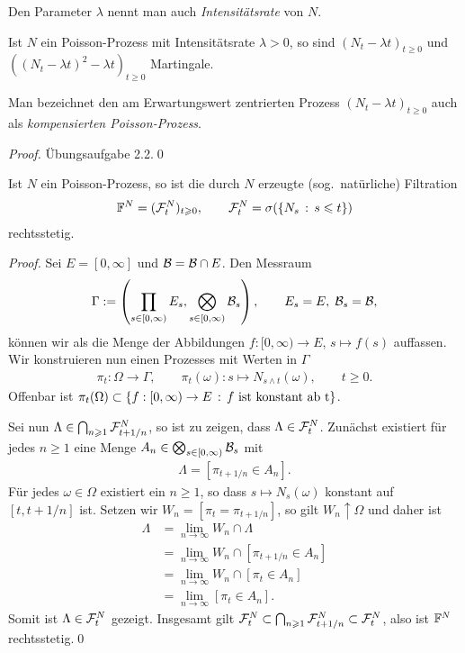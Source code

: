 Den Parameter $\lambda$ nennt man auch \emph{Intensitätsrate} von $N$.

\begin{prop}
\label{prop:1.22}
Ist $N$ ein Poisson-Prozess mit Intensitätsrate $\lambda>0$, so sind
$(N_t-\lambda t)_{t\ge 0}$ und $((N_t-\lambda t)^2-\lambda t)_{t\ge 0}$
Martingale.\fish
\end{prop}

Man bezeichnet den am Erwartungswert zentrierten Prozess
$(N_t-\lambda t)_{t\ge 0}$ auch als \emph{kompensierten Poisson-Prozess}.

\begin{proof}
Übungsaufgabe 2.2.\qed
\end{proof}

\begin{prop}
\label{prop:1.23}
  Ist $N$ ein Poisson-Prozess, so ist die durch $N$ erzeugte (sog.\
  natürliche) Filtration
  \begin{align*}
\F^N=(\FF_t^N)_{t\ge 0},\qquad \FF_t^N = \sigma(\setdef{N_s}{ s \le t})
\end{align*}
rechtsstetig.\fish
\end{prop}
\begin{proof}
Sei $E=[0,\infty]$ und $\mathcal{B} = \mathcal{B}\cap E$. Den Messraum
\begin{align*}
\Gamma:= \left(\prod_{s\in[0,\infty)} E_s, \bigotimes_{s\in [0,\infty)}
\mathcal{B}_s\right),\qquad E_s= E,\; \mathcal{B}_s = \mathcal{B},
\end{align*}
können wir als die Menge der Abbildungen $f: [0,\infty)\to E$, $s\mapsto
f(s)$ auffassen.  Wir konstruieren nun einen Prozesses mit Werten in $\Gamma$
\begin{align*}
\pi_t : \Omega\to \Gamma,\qquad \pi_t(\omega) : s\mapsto N_{s\wedge
t}(\omega),\qquad t\ge 0.
\end{align*}
Offenbar ist $\pi_t(\Omega)\subset\setdef{f : [0,\infty)\to E}{f\text{ ist
konstant ab t}}$.

Sei nun $\Lambda\in \bigcap_{n\geqslant 1} \mathcal{F}_{t+1/n}^N$, so ist zu zeigen, dass
$\Lambda\in \mathcal{F}_t^N$. Zunächst existiert für jedes $n\ge 1$ eine Menge
$A_n\in\bigotimes_{s\in [0,\infty)}
\mathcal{B}_s$ mit
\begin{align*}
\Lambda = [\pi_{t+1/n} \in A_n].
\end{align*}
Für jedes $\omega\in \Omega$ existiert ein $n\ge 1$, so dass $s\mapsto
N_s(\omega)$ konstant auf $[t,t+1/n]$ ist. Setzen wir $W_n = [\pi_t =
\pi_{t+1/n}]$, so gilt $W_n\uparrow \Omega$ und daher ist
\begin{align*}
\Lambda &= \lim\limits_{n\to \infty} W_n\cap \Lambda\\
&= \lim\limits_{n\to \infty} W_n\cap [\pi_{t+1/n}\in A_n]\\
&= \lim\limits_{n\to \infty} W_n\cap [\pi_{t}\in A_n]\\
&= \lim\limits_{n\to \infty} [\pi_{t}\in A_n].
\end{align*}
Somit ist $\Lambda\in \mathcal{F}_t^N$ gezeigt. Insgesamt gilt $\mathcal{F}_t^N \subset
\bigcap_{n\geqslant 1} \mathcal{F}_{t+1/n}^N \subset \mathcal{F}_t^N$, also ist $\mathbb{F}^N$
rechtsstetig.\qed
\end{proof}

